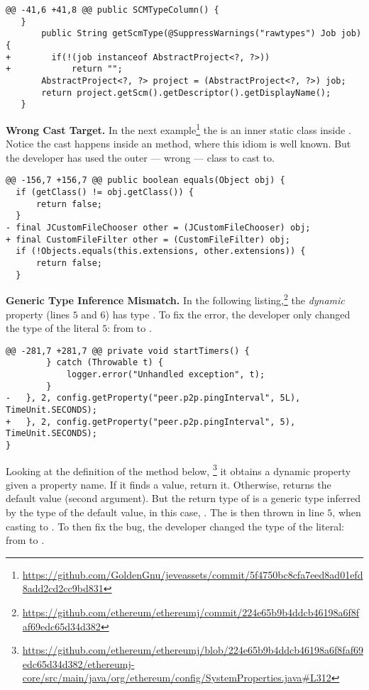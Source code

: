 \begin{lstlisting}[style=java]
@@ -41,6 +41,8 @@ public SCMTypeColumn() {
   }
       public String getScmType(@SuppressWarnings("rawtypes") Job job) {
+        if(!(job instanceof AbstractProject<?, ?>))
+            return "";
       AbstractProject<?, ?> project = (AbstractProject<?, ?>) job;
       return project.getScm().getDescriptor().getDisplayName();
   }
\end{lstlisting}

\textbf{Wrong Cast Target.}
In the next example\footnote{\url{https://github.com/GoldenGnu/jeveassets/commit/5f4750bc8cfa7eed8ad01efd8add2cd2cc9bd831}}
the  is an inner static class inside .
Notice the cast happens inside an  method, where this idiom is well known.
But the developer has used the outer --- wrong --- class to cast to.

\begin{lstlisting}[style=java]
@@ -156,7 +156,7 @@ public boolean equals(Object obj) {
  if (getClass() != obj.getClass()) {
      return false;
  }
- final JCustomFileChooser other = (JCustomFileChooser) obj;
+ final CustomFileFilter other = (CustomFileFilter) obj;
  if (!Objects.equals(this.extensions, other.extensions)) {
      return false;
  }
\end{lstlisting}

\textbf{Generic Type Inference Mismatch.}
In the following listing,\footnote{\url{https://github.com/ethereum/ethereumj/commit/224e65b9b4ddcb46198a6f8faf69edc65d34d382}}
the \emph{dynamic} property  (lines $5$ and $6$) has type .
To fix the error, the developer only changed the type of the literal $5$: from  to .

\begin{lstlisting}[style=java]
@@ -281,7 +281,7 @@ private void startTimers() {
        } catch (Throwable t) {
            logger.error("Unhandled exception", t);
        }
-   }, 2, config.getProperty("peer.p2p.pingInterval", 5L), TimeUnit.SECONDS);
+   }, 2, config.getProperty("peer.p2p.pingInterval", 5), TimeUnit.SECONDS);
}
\end{lstlisting}

Looking at the definition of the  method below,%
\footnote{\url{https://github.com/ethereum/ethereumj/blob/224e65b9b4ddcb46198a6f8faf69edc65d34d382/ethereumj-core/src/main/java/org/ethereum/config/SystemProperties.java\#L312}}
it obtains a dynamic property given a property name.
If it finds a value, return it.
Otherwise, returns the default value (second argument).
But the return type of 
is a generic type inferred by the type of the default value, in this case, .
The  is then thrown in line $5$, when casting  to .
To then fix the bug, the developer changed the type of the literal: from  to .



